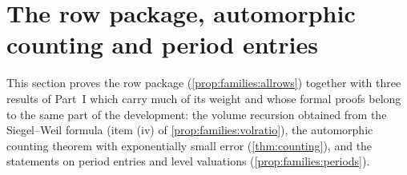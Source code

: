 \section{The row package, automorphic counting and period entries}\label{sec:pf:rows}

\providecommand{\rowsRow}{\sfname{Row}}
\providecommand{\rowsRowZ}{\sfname{Row}_0}
\providecommand{\rowsAtAll}{\mathrm{All}}
\providecommand{\rowsEvP}{\mathrm{Ev}_{\mathrm{par}}}
\providecommand{\rowsEvC}{\mathcal{E}}
\providecommand{\rowsLBC}{\mathrm{LB}}
\providecommand{\rowsLg}{\mathrm{Lg}}
\providecommand{\rowsLinked}{\sfname{LinkedAt}}
\providecommand{\rowsClosed}{\sfname{Closed}}
\providecommand{\rowsBuilt}{\sfname{IsBuiltE}}
\providecommand{\rowsGood}{\sfname{IsGoodE}}
\providecommand{\rowsKPx}{\mathrm{KP}_x}
\providecommand{\rowsDiii}{\mathcal{D}_3}
\providecommand{\rowsWi}{\mathcal{W}_1}
\providecommand{\rowsWiii}{\mathcal{W}_3}
\providecommand{\rowsLk}{\mathrm{Lk}}
\providecommand{\rowsGA}{G_{\A}}
\providecommand{\rowsGinf}{G_\infty}
\providecommand{\rowsGf}{G_{\mathrm f}}
\providecommand{\rowsDst}{D_*}
\providecommand{\rowsDc}{D}
\providecommand{\rowsCH}{\mathrm{CH}}
\providecommand{\rowsSWone}{\mathrm{SW}_1}
\providecommand{\rowsgv}{\operatorname{gvol}}
\providecommand{\rowsvU}{v_{\Uni}}
\providecommand{\rowsmr}{\operatorname{mr}}
\providecommand{\rowsrf}{\operatorname{rf}}
\providecommand{\rowsmc}{\operatorname{mc}}
\providecommand{\rowsleast}{\operatorname{least}}
\providecommand{\rowssize}{\operatorname{size}}
\providecommand{\rowssizeQ}{\operatorname{size}}
\providecommand{\rowsdHS}{d_{\mathrm{HS}}}
\providecommand{\rowsdOp}{d_{\mathrm{op}}}
\providecommand{\rowskap}{\kappa}
\providecommand{\rowsdens}{\operatorname{dens}}
\providecommand{\rowsdimN}{\nu}
\providecommand{\rowsdeep}{\mathcal{X}_{\mathrm{deep}}}
\providecommand{\rowsmod}{\mathcal{X}_{\mathrm{mod}}}
\providecommand{\rowsLv}{\Lambda}
\providecommand{\rowsRes}{\rho_E}

This section proves the row package (\cref{prop:families:allrows}) together with three results of Part~I which
carry much of its weight and whose formal proofs belong to the same part of the development: the volume
recursion obtained from the Siegel--Weil formula (item (iv) of \cref{prop:families:volratio}), the automorphic
counting theorem with exponentially small error (\cref{thm:counting}), and the statements on period entries and
level valuations (\cref{prop:families:periods}).

